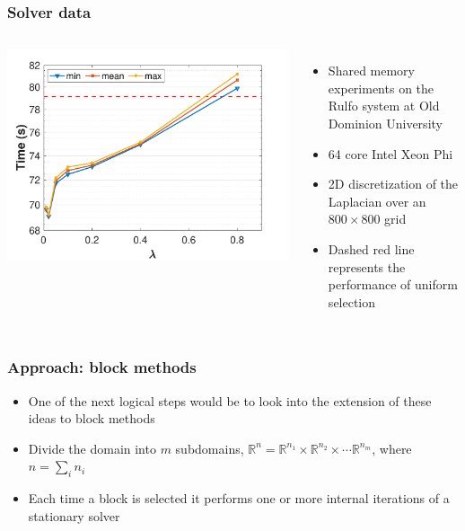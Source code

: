 \documentclass{beamer}
\begin{document}
\begin{frame}
	\frametitle{Solver data}
       \begin{columns}
             \centering
             \includegraphics[width=\linewidth]{images/expoDist_calcTimes_all_1tbr.pdf}
              \begin{itemize}
                  \item Shared memory experiments on the Rulfo system at Old Dominion University
                  \item 64 core Intel Xeon Phi
                  \item 2D discretization of the Laplacian over an $800 \times 800$ grid
                  \item Dashed red line represents the performance of uniform selection
              \end{itemize}
         \end{columns}
\end{frame}




\begin{frame}
	\frametitle{Approach: block methods}
	\begin{itemize}
	    \item One of the next logical steps would be to look into the extension of these ideas to block methods
		\item Divide the domain into $m$ subdomains, $\mathbb{R}^n = \mathbb{R}^{n_1} \times \mathbb{R}^{n_2} \times \cdots \mathbb{R}^{n_m}$, where $n = \sum_i n_i$
		\item Each time a block is selected it performs one or more internal iterations of a stationary solver
	\end{itemize}
\end{frame}
\end{document}
